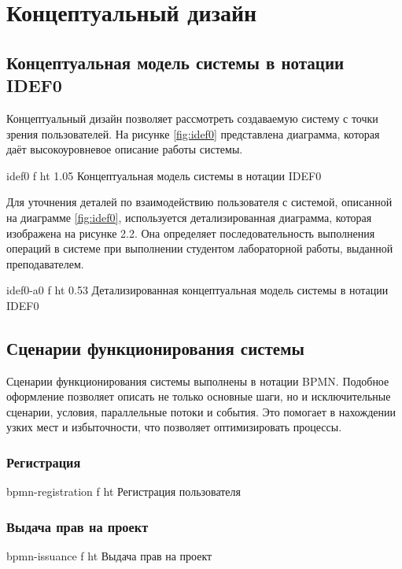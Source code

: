 \documentclass{bmstu}
\begin{document}
  \chapter{Концептуальный дизайн}
  
  \section{Концептуальная модель системы в нотации IDEF0}
  
  Концептуальный дизайн позволяет рассмотреть создаваемую систему с
  точки зрения пользователей. На рисунке \ref{fig:idef0} представлена диаграмма,
  которая даёт высокоуровневое описание работы системы.
  
  {idef0}
  {f}
  {ht}
  {1.05\textwidth}
  {Концептуальная модель системы в нотации IDEF0}
  \label{fig:idef0}
  
  Для уточнения деталей по взаимодействию пользователя с системой, описанной 
  на диаграмме \ref{fig:idef0}, используется детализированная диаграмма, которая изображена
  на рисунке 2.2. Она определяет последовательность выполнения операций в системе
  при выполнении студентом лабораторной работы, выданной преподавателем.
  
  {idef0-a0}
  {f}
  {ht}
  {0.53\textwidth}
  {Детализированная концептуальная модель системы в нотации IDEF0}
  \label{fig:idef0-a0}
  
  \FloatBarrier
  
\section{Сценарии функционирования системы}

Сценарии функционирования системы выполнены в нотации BPMN. 
Подобное оформление позволяет описать не только основные шаги, но и
исключительные сценарии, условия, параллельные потоки и события. 
Это помогает в нахождении узких мест и избыточности, что
позволяет оптимизировать процессы. 

\subsection*{Регистрация}
{bpmn-registration}
{f}
{ht}
{\textwidth}
{Регистрация пользователя}
\FloatBarrier

\subsection*{Выдача прав на проект}
{bpmn-issuance}
{f}
{ht}
{\textwidth}
{Выдача прав на проект}
\FloatBarrier
\end{document}
